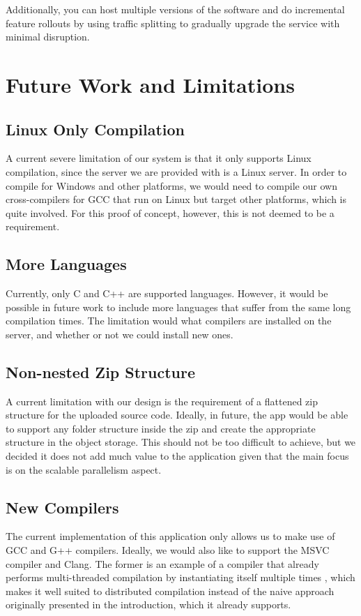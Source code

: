 \documentclass[conference]{IEEEtran}
\begin{document}
Additionally, you can host multiple versions of the software and do incremental
feature rollouts by using traffic splitting to gradually upgrade the service with
minimal disruption.

\section{Future Work and Limitations}
\subsection{Linux Only Compilation}
A current severe limitation of our system is that it only supports Linux
compilation, since the server we are provided with is a Linux server. In order
to compile for Windows and other platforms, we would need to compile our own
cross-compilers for GCC that run on Linux but target other platforms, which is
quite involved. For this proof of concept, however, this is not deemed to be a
requirement.
\subsection{More Languages}
Currently, only C and C++ are supported languages. However, it would be possible
in future work to include more languages that suffer from the same long
compilation times. The limitation would what compilers are installed on
the server, and whether or not we could install new ones.
\subsection{Non-nested Zip Structure}
A current limitation with our design is the requirement of a flattened zip
structure for the uploaded source code. Ideally, in future, the app would be
able to support any folder structure inside the zip and create the appropriate
structure in the object storage. This should not be too difficult to achieve,
but we decided it does not add much value to the application given that the main
focus is on the scalable parallelism aspect.
\subsection{New Compilers}
The current implementation of this application only allows us to make use of GCC
and G++ compilers. Ideally, we would also like to support the MSVC compiler and
Clang. The former is an example of a compiler that already performs
multi-threaded compilation by instantiating itself multiple times \cite{MSVC}, which makes
it well suited to distributed compilation instead of the naive approach
originally presented in the introduction, which it already supports.
\end{document}
